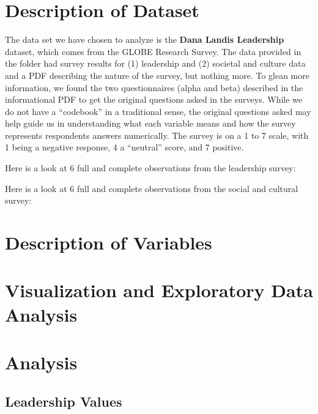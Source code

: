 \documentclass[
]{article}
\begin{document}
\hypertarget{description-of-dataset}{%
\section{Description of Dataset}\label{description-of-dataset}}

The data set we have chosen to analyze is the \textbf{Dana Landis
Leadership} dataset, which comes from the GLOBE Research Survey. The
data provided in the folder had survey results for (1) leadership and
(2) societal and culture data and a PDF describing the nature of the
survey, but nothing more. To glean more information, we found the two
questionnaires (alpha and beta) described in the informational PDF to
get the original questions asked in the surveys. While we do not have a
``codebook'' in a traditional sense, the original questions asked may
help guide us in understanding what each variable means and how the
survey represents respondents answers numerically. The survey is on a 1
to 7 scale, with 1 being a negative response, 4 a ``neutral'' score, and
7 positive.

Here is a look at 6 full and complete observations from the leadership
survey:

Here is a look at 6 full and complete observations from the social and
cultural survey:

\hypertarget{description-of-variables}{%
\section{Description of Variables}\label{description-of-variables}}

\hypertarget{visualization-and-exploratory-data-analysis}{%
\section{Visualization and Exploratory Data
Analysis}\label{visualization-and-exploratory-data-analysis}}

\hypertarget{analysis}{%
\section{Analysis}\label{analysis}}

\hypertarget{leadership-values}{%
\subsection{Leadership Values}\label{leadership-values}}
\end{document}
